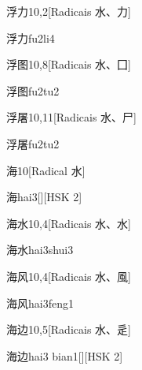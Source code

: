 \begin{entry}{浮力}{10,2}[Radicais ⽔、⼒]
  \begin{phonetics}{浮力}{fu2li4}
  \end{phonetics}
\end{entry}

\begin{entry}{浮图}{10,8}[Radicais ⽔、⼞]
  \begin{phonetics}{浮图}{fu2tu2}
  \end{phonetics}
\end{entry}

\begin{entry}{浮屠}{10,11}[Radicais ⽔、⼫]
  \begin{phonetics}{浮屠}{fu2tu2}
  \end{phonetics}
\end{entry}

\begin{entry}{海}{10}[Radical ⽔]
  \begin{phonetics}{海}{hai3}[][HSK 2]
  \end{phonetics}
\end{entry}

\begin{entry}{海水}{10,4}[Radicais ⽔、⽔]
  \begin{phonetics}{海水}{hai3shui3}
  \end{phonetics}
\end{entry}

\begin{entry}{海风}{10,4}[Radicais ⽔、⾵]
  \begin{phonetics}{海风}{hai3feng1}
  \end{phonetics}
\end{entry}

\begin{entry}{海边}{10,5}[Radicais ⽔、⾡]
  \begin{phonetics}{海边}{hai3 bian1}[][HSK 2]
  \end{phonetics}
\end{entry}

